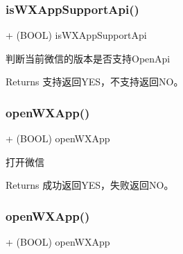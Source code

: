 \subsubsection{\texorpdfstring{is\+W\+X\+App\+Support\+Api()}{isWXAppSupportApi()}\hspace{0.1cm}{\footnotesize\ttfamily [3/3]}}
{\footnotesize\ttfamily + (B\+O\+OL) is\+W\+X\+App\+Support\+Api \begin{DoxyParamCaption}{ }\end{DoxyParamCaption}}



判断当前微信的版本是否支持\+Open\+Api 

\begin{DoxyReturn}{Returns}
支持返回\+Y\+E\+S，不支持返回\+N\+O。 
\end{DoxyReturn}
\mbox{\label{interface_w_x_api_ac238ad8f1aa670ea9b26836f77701dc2}} 
\subsubsection{\texorpdfstring{open\+W\+X\+App()}{openWXApp()}\hspace{0.1cm}{\footnotesize\ttfamily [1/3]}}
{\footnotesize\ttfamily + (B\+O\+OL) open\+W\+X\+App \begin{DoxyParamCaption}{ }\end{DoxyParamCaption}}



打开微信 

\begin{DoxyReturn}{Returns}
成功返回\+Y\+E\+S，失败返回\+N\+O。 
\end{DoxyReturn}
\mbox{\label{interface_w_x_api_ac238ad8f1aa670ea9b26836f77701dc2}} 
\subsubsection{\texorpdfstring{open\+W\+X\+App()}{openWXApp()}\hspace{0.1cm}{\footnotesize\ttfamily [2/3]}}
{\footnotesize\ttfamily + (B\+O\+OL) open\+W\+X\+App \begin{DoxyParamCaption}{ }\end{DoxyParamCaption}}



